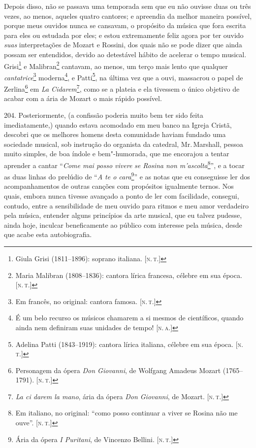 Depois disso, não se passava uma temporada sem que eu não ouvisse duas
ou três vezes, ao menos, aqueles quatro cantores; e apreendia da melhor
maneira possível, porque meus ouvidos nunca se cansavam, o propósito da
música que fora escrita para eles ou estudada por eles; e estou
extremamente feliz agora por ter ouvido \emph{suas} interpretações de
Mozart e Rossini, dos quais não se pode dizer que ainda possam ser
entendidos, devido ao detestável hábito de acelerar o tempo musical.
Grisi\footnote{Giula Grisi (1811--1896): soprano italiana. {[}\textsc{n.\,t.}{]}}
e Malibran\footnote{Maria Malibran (1808--1836): cantora lírica francesa,
  célebre em sua época. {[}\textsc{n.\,t.}{]}} cantavam, ao menos, um terço
mais lento que qualquer \emph{cantatrice}\footnote{Em francês, no
  original: cantora famosa. {[}\textsc{n.\,t.}{]}} moderna\footnote{É um belo
  recurso os músicos chamarem a si mesmos de científicos, quando ainda
  nem definiram suas unidades de tempo! {[}\textsc{n.\,a.}{]}}, e
Patti\footnote{Adelina Patti (1843--1919): cantora lírica italiana,
  célebre em sua época. {[}\textsc{n.\,t.}{]}}, na última vez que a ouvi,
massacrou o papel de Zerlina\footnote{Personagem da ópera \emph{Don
  Giovanni}, de Wolfgang Amadeus Mozart (1765--1791). {[}\textsc{n.\,t.}{]}} em
\emph{La Cidarem}\footnote{\emph{La ci darem la mano}, ária da ópera
  \emph{Don Giovanni}, de Mozart. {[}\textsc{n.\,t.}{]}}, como se a plateia e
ela tivessem o único objetivo de acabar com a ária de Mozart o mais
rápido possível.

204. Posteriormente, (a confissão poderia muito bem ter sido feita
imediatamente,) quando estava acomodado em meu banco na Igreja Cristã,
descobri que os melhores homens desta comunidade haviam fundado uma
sociedade musical, sob instrução do organista da catedral, Mr.\,Marshall,
pessoa muito simples, de boa índole e bem"-humorada, que me encorajou a
tentar aprender a cantar ``\emph{Come mai posso vivere} \emph{se Rosina
non m'ascolta}\footnote{Em italiano, no original: ``como posso continuar
  a viver se Rosina não me ouve''. {[}\textsc{n.\,t.}{]}}'', e a tocar as duas
linhas do prelúdio de ``\emph{A te o cara}\footnote{Ária da ópera
  \emph{I Puritani}, de Vincenzo Bellini. {[}\textsc{n.\,t.}{]}}'' e as
notas que eu conseguisse ler dos acompanhamentos de outras canções com
propósitos igualmente ternos. Nos quais, embora nunca tivesse avançado a
ponto de ler com facilidade, consegui, contudo, entre a sensibilidade de
meu ouvido para ritmos e meu amor verdadeiro pela música, entender
alguns princípios da arte musical, que eu talvez pudesse, ainda hoje,
inculcar beneficamente ao público com interesse pela música, desde que
acabe esta autobiografia.

